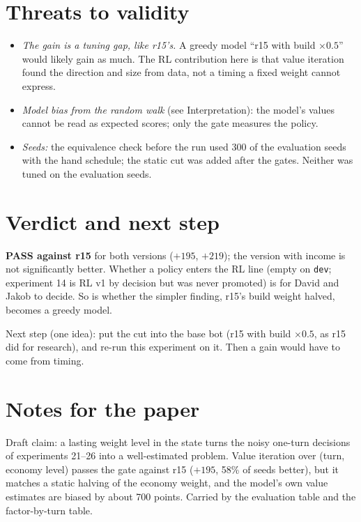 \documentclass{../polyexp}
\begin{document}
\section{Threats to validity}
\begin{itemize}
  \item \emph{The gain is a tuning gap, like r15's.} A greedy model ``r15 with build $\times0.5$'' would likely
        gain as much. The RL contribution here is that value iteration found the direction and size from data,
        not a timing a fixed weight cannot express.
  \item \emph{Model bias from the random walk} (see Interpretation): the model's values cannot be read as
        expected scores; only the gate measures the policy.
  \item \emph{Seeds:} the equivalence check before the run used 300 of the evaluation seeds with the hand schedule;
        the static cut was added after the gates. Neither was tuned on the evaluation seeds.
\end{itemize}

\section{Verdict and next step}
\textbf{PASS against r15} for both versions ($+195$, $+219$); the version with income is not significantly better.
Whether a policy enters the RL line (empty on \texttt{dev}; experiment 14 is RL v1 by decision but was never
promoted) is for David and Jakob to decide. So is whether the simpler finding, r15's build weight halved, becomes a
greedy model.

Next step (one idea): put the cut into the base bot (r15 with build $\times0.5$, as r15 did for research), and
re-run this experiment on it. Then a gain would have to come from timing.

\section{Notes for the paper}
Draft claim: a lasting weight level in the state turns the noisy one-turn decisions of experiments 21--26 into a
well-estimated problem. Value iteration over (turn, economy level) passes the gate against r15 ($+195$, 58\% of seeds
better), but it matches a static halving of the economy weight, and the model's own value estimates are biased by
about 700 points. Carried by the evaluation table and the factor-by-turn table.
\end{document}
